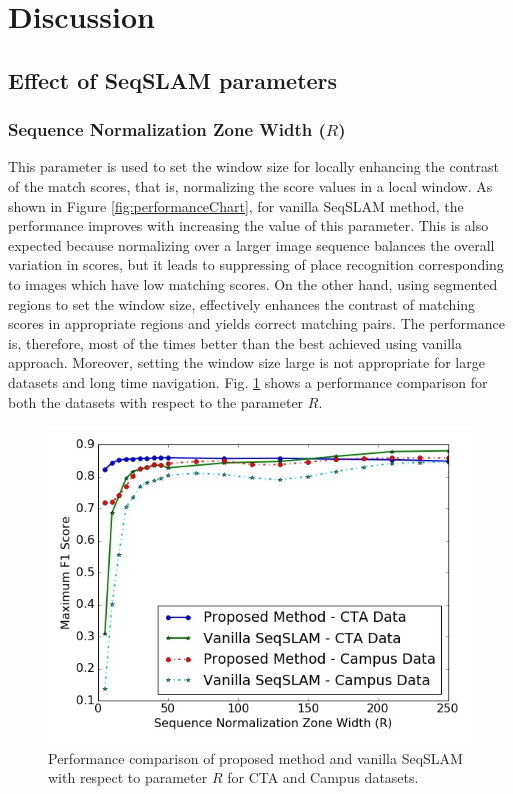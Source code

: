 \documentclass[letterpaper, 10 pt, conference]{ieeeconf}  %
\begin{document}
\section{Discussion}
\subsection{Effect of SeqSLAM parameters}
\subsubsection{Sequence Normalization Zone Width ($R$)}
This parameter is used to set the window size for locally enhancing the contrast of the match scores, that is, normalizing the score values in a local window. As shown in Figure \ref{fig:performanceChart}, for vanilla SeqSLAM method, the performance improves with increasing the value of this parameter. This is also expected because normalizing over a larger image sequence balances the overall variation in scores, but it leads to suppressing of place recognition corresponding to images which have low matching scores. On the other hand, using segmented regions to set the window size, effectively enhances the contrast of matching scores in appropriate regions and yields correct matching pairs. The performance is, therefore, most of the times better than the best achieved using vanilla approach. Moreover, setting the window size large is not appropriate for large datasets and long time navigation. Fig. \ref{fig:RPerformance} shows a performance comparison for both the datasets with respect to the parameter $R$.

\begin{figure}
 \includegraphics[scale=0.4]{RPerformance}
 \caption{Performance comparison of proposed method and vanilla SeqSLAM with respect to parameter $R$ for CTA and Campus datasets.}
 \label{fig:RPerformance}
\end{figure}
\end{document}
